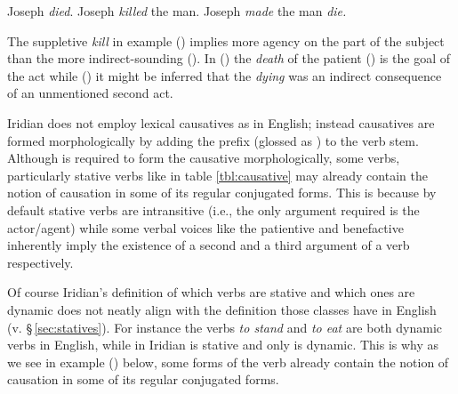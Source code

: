 \pex
\a Joseph \emph{died}.
\a Joseph \emph{killed} the man.
\a Joseph \emph{made} the man \emph{die.}
\xe

The suppletive \emph{kill} in example () implies more agency on the part of the subject than the more indirect-sounding (). In () the \emph{death} of the patient () is the goal of the act while () it might be inferred that the \emph{dying} was an indirect consequence of an unmentioned second act.


Iridian does not employ lexical causatives as in English; instead causatives are formed morphologically by adding the prefix  (glossed as ) to the verb stem. Although  is required to form the causative morphologically, some verbs, particularly stative verbs like  in table \ref{tbl:causative} may already contain the notion of causation in some of its regular conjugated forms. This is because by default stative verbs are intransitive (i.e., the only argument required is the actor/agent) while some verbal voices like the patientive and benefactive inherently imply the existence of a second and a third argument of a verb respectively.


Of course Iridian's definition of which verbs are stative and which ones are dynamic does not neatly align with the definition those classes have in English (v. \S\,\ref{sec:statives}). For instance the verbs \emph{to stand} and \emph{to eat} are both dynamic verbs in English, while in Iridian  is stative and only  is dynamic. This is why as we see in example () below, some forms of the verb  already contain the notion of causation in some of its regular conjugated forms.

\pex
\a  {}\\
	\\
    \\
    \\
\a  {}\\
    \\
\xe

